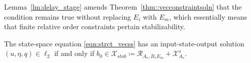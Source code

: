 Lemma~\ref{lm:delay_stage} amends Theorem~\ref{thm::vecconstraintsoln} that the condition remains true without replacing \(E_i\) with \(E_m\), which essentially means that finite relative order constraints pertain stabilizability. 
\begin{lemma}\label{lm:delay_stage}
The state-space equation \eqref{eqn:strct_vecss} has an input-state-output solution \((u,\eta,q)\in \ell_2\) if and only if \(b_0 \in \mathcal{X}_{stab} \coloneqq \mathcal{R}_{A_v,B_v E_m} + \mathcal{X}_{A_v}^s\).
\end{lemma}


